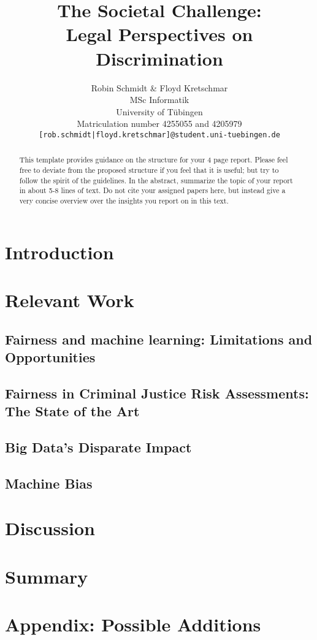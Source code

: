 \documentclass{article}
\title{The Societal Challenge: \\ Legal Perspectives on Discrimination}
\author{%
  Robin Schmidt \& Floyd Kretschmar\\
  MSc Informatik \\
  University of Tübingen\\
  Matriculation number 4255055 and 4205979\\
  \texttt{[rob.schmidt|floyd.kretschmar]@student.uni-tuebingen.de}
}
\begin{document}
\maketitle

\begin{abstract}
  This template provides guidance on the structure for your 4 page report. Please feel free to deviate from the proposed structure if you feel that it is useful; but try to follow the spirit of the guidelines.
  In the abstract, summarize the topic of your report in about 5-8 lines of text. Do not cite your assigned papers here, but instead give a very concise overview over the insights you report on in this text.
\end{abstract}

\section{Introduction}

\section{Relevant Work}

\subsection{Fairness and machine learning: Limitations and Opportunities}


\subsection{Fairness in Criminal Justice Risk Assessments: The State of the Art}


\subsection{Big Data’s Disparate Impact}


\subsection{Machine Bias}


\section{Discussion}


\section{Summary}


\newpage
\section{Appendix: Possible Additions}


\medskip
\small


\end{document}
